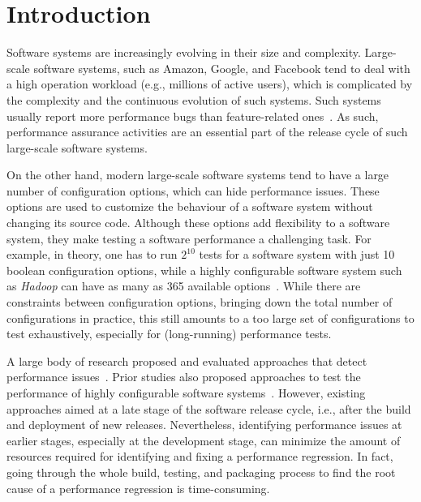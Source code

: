 
\section{Introduction}
\label{sec:intro}
Software systems are increasingly evolving in their size and complexity.
Large-scale software systems, such as Amazon, Google, and Facebook tend to deal with a high operation workload (e.g., millions of active users), which is complicated by the complexity and the continuous evolution of such systems. Such systems usually report more performance bugs than feature-related ones~\cite{weyuker2000experience}. As such, performance assurance activities are an essential part of the release cycle of such large-scale software systems.

On the other hand, modern large-scale software systems tend to have a large number of configuration options, which can hide performance issues. %
These options are used to customize the behaviour of a software system without changing its source code. Although these options add flexibility to a software system, they make testing a software performance a challenging task. For example, in theory, one has to run $2^
{10}$ tests for a software system with just 10 boolean configuration options, while a highly configurable software system such as \emph{Hadoop} can have as many as 365 available options~\cite{tse}. While there are constraints between configuration options, bringing down the total number of configurations in practice, this still amounts to a too large set of configurations to test exhaustively, especially for (long-running) performance tests.
 
A large body of research proposed and evaluated approaches that detect performance issues~\cite{Nguyen:2012:ADP,nguyen2011automated,Nguyen:2014:ICS,foo2010mining,DBLP:conf/icse/FooJAHZF15}. Prior studies also proposed approaches to test the performance of highly configurable software systems~\cite{DBLP:journals/dt/SaxenaFHMYM00,wu2010performance,DBLP:journals/ese/HalinNADPB19}. However, existing approaches aimed at a late stage of the software release cycle, i.e., after the build and deployment of new releases. Nevertheless, identifying performance issues at earlier stages, especially at the development stage, can minimize the amount of resources required for identifying and fixing a performance regression. In fact, going through the whole build, testing, and packaging process to find the root cause of a performance regression is time-consuming. %


